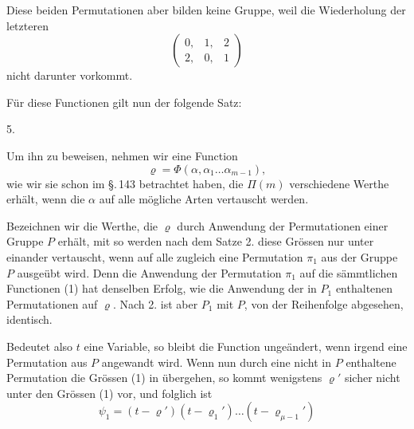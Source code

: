 
Diese beiden Permutationen aber bilden keine Gruppe, weil die Wiederholung der letzteren
\[
\begin{pmatrix} 0, & 1, & 2 \\ 2, & 0, & 1 \end{pmatrix}
\]
nicht darunter vorkommt.

Für diese Functionen gilt nun der folgende Satz:

5. 

Um ihn zu beweisen, nehmen wir eine Function
\[
\varrho = \Phi(\alpha, \alpha_1 \dots \alpha_{m-1}),
\]
wie wir sie schon im \S.\,143 betrachtet haben, die $\Pi(m)$ verschiedene Werthe erhält, wenn die $\alpha$ auf alle mögliche Arten vertauscht werden.

Bezeichnen wir die Werthe, die $\varrho$ durch Anwendung der Permutationen einer Gruppe $P$ erhält, mit
so werden nach dem Satze 2. diese Grössen nur unter einander vertauscht, wenn auf alle zugleich eine Permutation $\pi_1$ aus der Gruppe $P$ ausgeübt wird. Denn die Anwendung der Permutation $\pi_1$ auf die sämmtlichen Functionen (1) hat denselben Erfolg, wie die Anwendung der in $P_1$ enthaltenen Permutationen auf $\varrho$. Nach 2. ist aber $P_1$ mit $P$, von der Reihenfolge abgesehen, identisch.

Bedeutet also $t$ eine Variable, so bleibt die Function
ungeändert, wenn irgend eine Permutation aus $P$ angewandt wird. Wenn nun durch eine nicht in $P$ enthaltene Permutation die Grössen (1) in
übergehen, so kommt wenigstens $\varrho'$ sicher nicht unter den Grössen (1) vor, und folglich ist
\[
\psi_1 = (t - \varrho')(t - \varrho_1') \dots (t - \varrho_{\mu-1}')
\]
